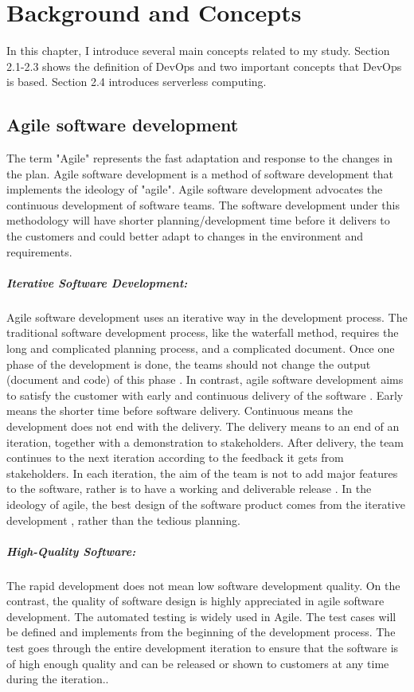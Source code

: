 \chapter{Background and Concepts}
In this chapter, I introduce several main concepts related to my study. Section 2.1-2.3 shows the definition of DevOps and two important concepts that DevOps is based. Section 2.4 introduces serverless computing.
\section{Agile software development}
\label{agile}
The term "Agile" represents the fast adaptation and response to the changes in the plan\cite{highsmith2002agile}.
Agile software development is a method of software development that implements the ideology of "agile". Agile software development advocates the continuous development of software teams. The software development under this methodology will have shorter planning/development time before it delivers to the customers and could better adapt to changes in the environment and requirements.
\paragraph{Iterative Software Development:} Agile software development uses an iterative way in the development process. The traditional software development process, like the waterfall method, requires the long and complicated planning process, and a complicated document. Once one phase of the development is done, the teams should not change the output (document and code) of this phase \cite{cusumano1995beyond}. In contrast, agile software development aims to satisfy the customer with early and continuous delivery of the software \cite{beck2001manifesto}. Early means the shorter time before software delivery. Continuous means the development does not end with the delivery. The delivery means to an end of an iteration, together with a demonstration to stakeholders. After delivery, the team continues to the next iteration according to the feedback it gets from stakeholders. In each iteration, the aim of the team is not to add major features to the software, rather is to have a working and deliverable release \cite{beck1999embracing}. In the ideology of agile, the best design of the software product comes from the iterative development \cite{beck2001manifesto}, rather than the tedious planning. 

\paragraph{High-Quality Software:} The rapid development does not mean low software development quality. On the contrast, the quality of software design is highly appreciated in agile software development. The automated testing is widely used in Agile. The test cases will be defined and implements from the beginning of the development process. The test goes through the entire development iteration to ensure that the software is of high enough quality and can be released or shown to customers at any time during the iteration.\cite{Agilesof32:online}.
